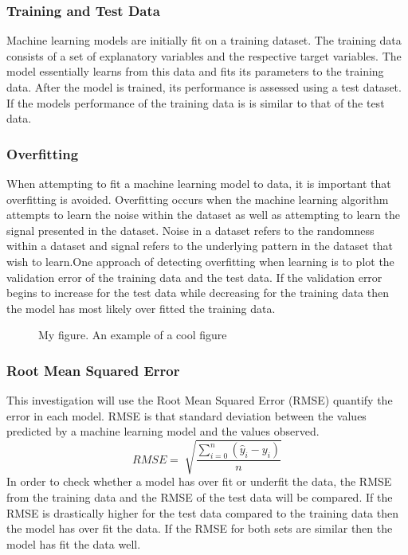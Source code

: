 \documentclass[a4paper,11pt,twoside]{article}
\begin{document}
 \subsubsection{Training and Test Data}
Machine learning models are initially fit on a training dataset. The training data consists of a set of explanatory variables and the respective target variables. The model essentially learns from this data and fits its parameters to the training data. After the model is trained, its performance is assessed using a test dataset. If the models performance of the training data is is similar to that of the test data.

\subsubsection{Overfitting}
When attempting to fit a machine learning model to data, it is important that overfitting is avoided. Overfitting occurs when the machine learning algorithm attempts to learn the noise within the dataset as well as attempting to learn the signal presented in the dataset. Noise in a dataset refers to the randomness within a dataset and signal refers to the underlying pattern in the dataset that wish to learn.One approach of detecting overfitting when learning is to plot the validation error of the training data and the test data. If the validation error begins to increase for the test data while decreasing for the training data then the model has most likely over fitted the training data. 

      \begin{figure}[!htb]
        \caption{\label{fig:my-label} My figure.  An example of a cool figure}
      \end{figure}

\subsubsection{Root Mean Squared Error}
This investigation will use the Root Mean Squared Error (RMSE) quantify the error in each model. RMSE is that standard deviation between the values predicted by a machine learning model and the values observed.
\begin{equation}
RMSE = \sqrt[]{\frac{\sum_{i=0}^{n}(\hat{y}_{i} - y_{i})}{n}}
\end{equation}
In order to check whether a model has over fit or underfit the data, the RMSE from the training data and the RMSE of the test data will be compared. If the RMSE is drastically higher for the test data compared to the training data then the model has over fit the data. If the RMSE for both sets are similar then the model has fit the data well. 
\end{document}
